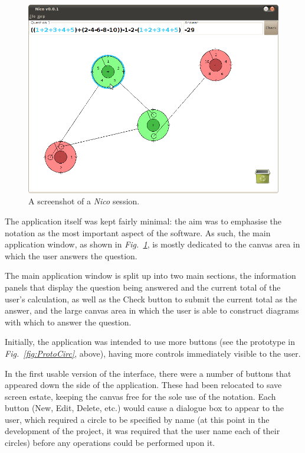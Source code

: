 \documentclass[12pt,twoside,notitlepage,xetex]{report}
\begin{document}
\begin{center}
\begin{figure}[H]
\begin{center}
\includegraphics[width=\textwidth]{figs/nico_screen_01.png}
\end{center}
\caption{A screenshot of a \emph{Nico} session.}
\label{fig:Nico1}
\end{figure}
\end{center}

The application itself was kept fairly minimal: the aim was to emphasise the notation as the most important aspect of the software.  As such, the main application window, as shown in \emph{Fig.~\ref{fig:Nico1}}, is mostly dedicated to the canvas area in which the user answers the question.

The main application window is split up into two main sections, the information panels that display the question being answered and the current total of the user's calculation, as well as the {\sfapp Check} button to submit the current total as the answer, and the large canvas area in which the user is able to construct diagrams with which to answer the question.

Initially, the application was intended to use more buttons (see the prototype in \emph{Fig.~\ref{fig:ProtoCirc}}, above), having more controls immediately visible to the user.

In the first usable version of the interface, there were a number of buttons that appeared down the side of the application.  These had been relocated to save screen estate, keeping the canvas free for the sole use of the notation.  Each button ({\sfapp New}, {\sfapp Edit}, {\sfapp Delete}, etc.) would cause a dialogue box to appear to the user, which required a circle to be specified by name (at this point in the development of the project, it was required that the user name each of their circles) before any operations could be performed upon it.
\end{document}
